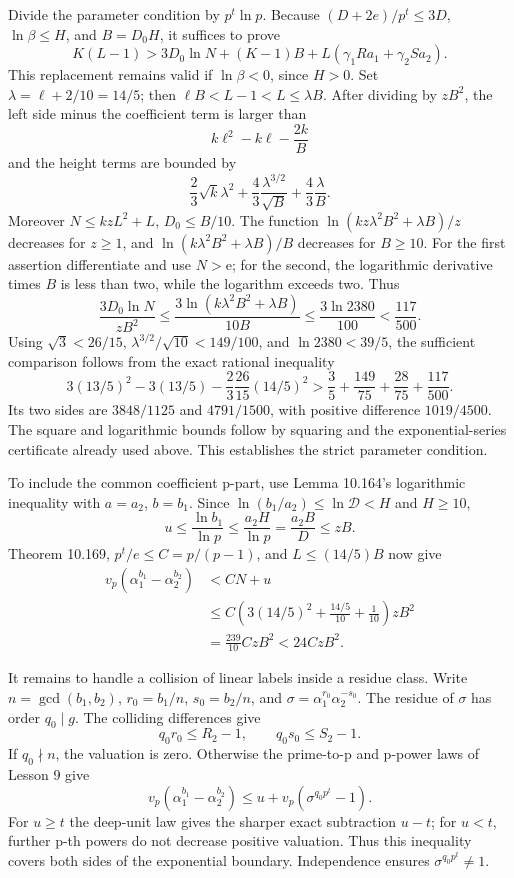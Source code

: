 \documentclass[
  11pt,
  a4paper,
]{article}
\begin{document}
Divide the parameter condition by \(p^t\ln p\). Because
\((D+2e)/p^t\le3D\), \(\ln\beta\le H\), and \(B=D_0H\), it suffices to
prove \[
K(L-1)>3D_0\ln N+(K-1)B
\mathbin{+}L(\gamma_1Ra_1+\gamma_2Sa_2).
\tag{10.618}
\] This replacement remains valid if \(\ln\beta<0\), since \(H>0\). Set
\(\lambda=\ell+2/10=14/5\); then \(\ell B<L-1<L\le\lambda B\). After
dividing by \(zB^2\), the left side minus the coefficient term is larger
than \[
k\ell^2-k\ell-\frac{2k}{B}
\tag{10.619}
\] and the height terms are bounded by \[
\frac23\sqrt{k}\lambda^2
\mathbin{+}\frac43\frac{\lambda^{3/2}}{\sqrt B}
\mathbin{+}\frac43\frac{\lambda}{B}.
\tag{10.620}
\] Moreover \(N\le kzL^2+L\), \(D_0\le B/10\). The function
\(\ln(kz\lambda^2B^2+\lambda B)/z\) decreases for \(z\ge1\), and
\(\ln(k\lambda^2B^2+\lambda B)/B\) decreases for \(B\ge10\). For the
first assertion differentiate and use \(N> \mathrm e\); for the second,
the logarithmic derivative times \(B\) is less than two, while the
logarithm exceeds two. Thus \[
\frac{3D_0\ln N}{zB^2}
\le\frac{3\ln(k\lambda^2B^2+\lambda B)}{10B}
\le\frac{3\ln2380}{100}<\frac{117}{500}.
\tag{10.621}
\] Using \(\sqrt3<26/15\), \(\lambda^{3/2}/\sqrt{10}<149/100\), and
\(\ln2380<39/5\), the sufficient comparison follows from the exact
rational inequality \[
3(13/5)^2-3(13/5)-\frac23\frac{26}{15}(14/5)^2
\mathrel{>}
\frac35+\frac{149}{75}+\frac{28}{75}+\frac{117}{500}.
\tag{10.622}
\] Its two sides are \(3848/1125\) and \(4791/1500\), with positive
difference \(1019/4500\). The square and logarithmic bounds follow by
squaring and the exponential-series certificate already used above. This
establishes the strict parameter condition.

To include the common coefficient p-part, use Lemma 10.164's logarithmic
inequality with \(a=a_2\), \(b=b_1\). Since
\(\ln(b_1/a_2)\le\ln\mathcal D<H\) and \(H\ge10\), \[
u\le\frac{\ln b_1}{\ln p}
\le\frac{a_2H}{\ln p}
=\frac{a_2B}{D}\le zB.
\tag{10.623}
\] Theorem 10.169, \(p^t/e\le C=p/(p-1)\), and \(L\le(14/5)B\) now give
\[
\begin{aligned}
v_p(\alpha_1^{b_1}-\alpha_2^{b_2})
&<CN+u\\
&\le C\left(3(14/5)^2+\frac{14/5}{10}+\frac1{10}\right)zB^2\\
&=\frac{239}{10}CzB^2<24CzB^2.
\end{aligned}
\tag{10.624}
\]

It remains to handle a collision of linear labels inside a residue
class. Write \(n=\gcd(b_1,b_2)\), \(r_0=b_1/n\), \(s_0=b_2/n\), and
\(\sigma=\alpha_1^{r_0}\alpha_2^{-s_0}\). The residue of \(\sigma\) has
order \(q_0\mid g\). The colliding differences give \[
q_0r_0\le R_2-1,\qquad q_0s_0\le S_2-1.
\tag{10.625}
\] If \(q_0\nmid n\), the valuation is zero. Otherwise the prime-to-p
and p-power laws of Lesson 9 give \[
v_p(\alpha_1^{b_1}-\alpha_2^{b_2})
\le u+v_p(\sigma^{q_0p^t}-1).
\tag{10.626}
\] For \(u\ge t\) the deep-unit law gives the sharper exact subtraction
\(u-t\); for \(u<t\), further p-th powers do not decrease positive
valuation. Thus this inequality covers both sides of the exponential
boundary. Independence ensures \(\sigma^{q_0p^t}\ne1\).
\end{document}
